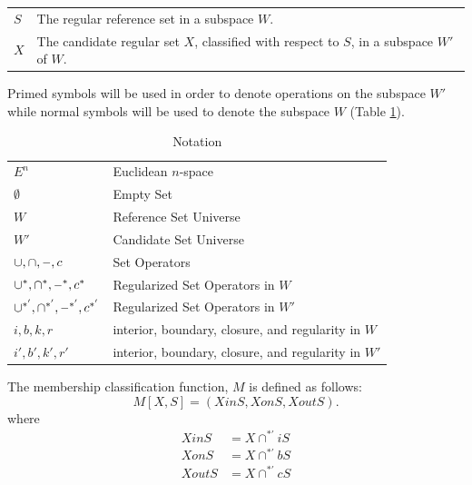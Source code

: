\documentclass[a4paper,11pt,oneside]{article}
\makeatletter
\newcommand{\minus}{\scalebox{0.9}[1.0]{$-$}} %
\newenvironment{conditions}
  {\par\vspace{\abovedisplayskip}\noindent\begin{tabular}{>{$}l<{$} @{${}={}$} l}}
  {\end{tabular}\par\vspace{\belowdisplayskip}}
\makeatother
\begin{document}
\begin{conditions}
	S     &  The regular reference set in a subspace $W$. \\
	X     &  The candidate regular set $X$, classified with respect to $S$, in a subspace $W'$ of $W$. \\
\end{conditions}

Primed symbols will be used	in order to denote operations on the subspace $W'$ while normal symbols will be used to denote the subspace $W$ (Table \ref{table:notations}).
 
\begin{table}
	\caption{Notation}
	\label{table:notations}
	\begin{tabularx}{\textwidth}{p{}X}
		\toprule
		$E^n$                                       & Euclidean $n$-space                                   \\
		$\emptyset$                                 & Empty Set                                           \\
		$W$                                         & Reference Set Universe                              \\
		$W'$                                        & Candidate Set Universe                              \\
		$\cup, \cap, \minus, c$                     & Set Operators                                       \\
		$\cup^*, \cap^*, \minus^*, c^*$             & Regularized Set Operators in $W$                    \\
		$\cup^{*'}, \cap^{*'}, \minus^{*'}, c^{*'}$ & Regularized Set Operators in $W'$                   \\
		$i, b, k, r$                                & interior, boundary, closure, and regularity in $W$  \\
		$i', b', k', r'$                            & interior, boundary, closure, and regularity in $W'$ \\
		\bottomrule
	\end{tabularx}
\end{table}

\begin{definition}
	The membership classification function, $M$ is defined as follows:
	\begin{equation}
		M[X, S] = (XinS, XonS, XoutS).
	\end{equation}
	where
	\begin{align*}
		XinS  & = X \cap^{*'} iS \\
		XonS  & = X \cap^{*'} bS \\
		XoutS & = X \cap^{*'} cS 
	\end{align*}
\end{definition}
\end{document}
